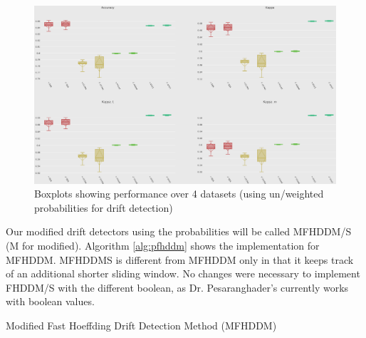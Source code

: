 \begin{figure}
  \includegraphics[width=\linewidth]{./images/boxplot_params_use_w}
\caption{\label{fig:boxplot_params_use_w}Boxplots showing performance over 4 datasets (using un/weighted probabilities for drift detection)}
\end{figure}

Our modified drift detectors using the probabilities will be called MFHDDM/S (M for modified).
Algorithm \ref{alg:pfhddm} shows the implementation for MFHDDM. MFHDDMS is different from MFHDDM only in that it keeps track of an additional shorter sliding window. No changes were necessary to implement FHDDM/S with the different boolean, as Dr. Pesaranghader's currently works with boolean values.

\begin{algorithm}
\caption{Modified Fast Hoeffding Drift Detection Method (MFHDDM)\label{alg:pfhddm}}


\end{algorithm}

